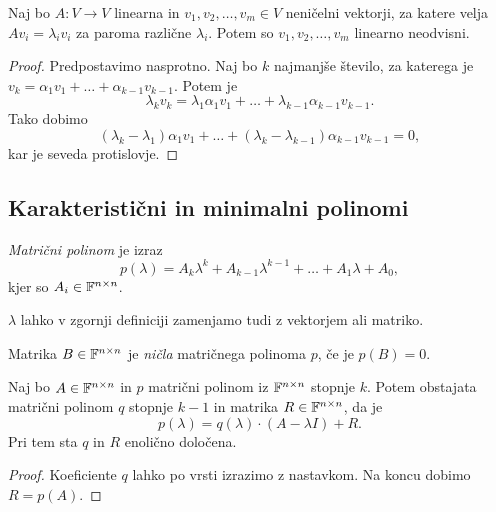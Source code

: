 \documentclass[12pt, a4paper]{article}
\begin{document}
\begin{trditev}
Naj bo $A\colon V\to V$ linearna in $v_1,v_2,\dots,v_m\in V$ neničelni vektorji, za katere velja $Av_i=\lambda_i v_i$ za paroma različne $\lambda_i$. Potem so $v_1,v_2,\dots,v_m$ linearno neodvisni.
\end{trditev}

\begin{proof}
Predpostavimo nasprotno. Naj bo $k$ najmanjše število, za katerega je $v_k=\alpha_1v_1+\dots+\alpha_{k-1}v_{k-1}$. Potem je
\[
\lambda_kv_k=\lambda_1\alpha_1v_1+\dots+\lambda_{k-1}\alpha_{k-1}v_{k-1}.
\]
Tako dobimo
\[
(\lambda_k-\lambda_1)\alpha_1v_1+\dots+(\lambda_k-\lambda_{k-1})\alpha_{k-1}v_{k-1}=0,
\]
kar je seveda protislovje.
\end{proof}

\newpage

\subsection{Karakteristični in minimalni polinomi}

\begin{okvir}
\begin{definicija}
\emph{Matrični polinom} je izraz
\[
p(\lambda)=A_k\lambda^k+A_{k-1}\lambda^{k-1}+\dots+A_1\lambda+A_0,
\]
kjer so $A_i\in\mathbb{F}^{n\times n}$.
\end{definicija}
\end{okvir}

\begin{opomba}
$\lambda$ lahko v zgornji definiciji zamenjamo tudi z vektorjem ali matriko.
\end{opomba}

\begin{definicija}
Matrika $B\in\mathbb{F}^{n\times n}$ je \emph{ničla} matričnega polinoma $p$, če je $p(B)=0$.
\end{definicija}

\begin{izrek}[Bezout]
Naj bo $A\in\mathbb{F}^{n\times n}$ in $p$ matrični polinom iz $\mathbb{F}^{n\times n}$ stopnje $k$. Potem obstajata matrični polinom $q$ stopnje $k-1$ in matrika $R\in\mathbb{F}^{n\times n}$, da je
\[
p(\lambda)=q(\lambda)\cdot(A-\lambda I)+R.
\]
Pri tem sta $q$ in $R$ enolično določena.
\end{izrek}

\begin{proof}
Koeficiente $q$ lahko po vrsti izrazimo z nastavkom. Na koncu dobimo $R=p(A)$.
\end{proof}
\end{document}
